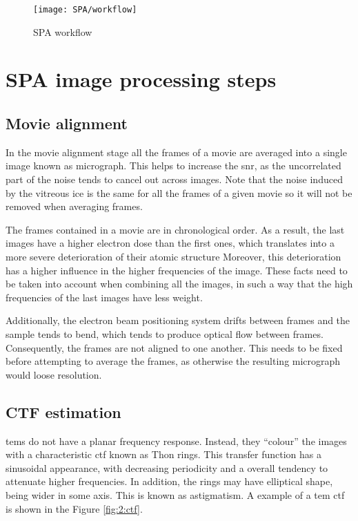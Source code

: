 \documentclass[../main.tex]{subfiles}
\begin{document}
\begin{landscape}
    \begin{figure}
        \centering
        \texttt{[image: SPA/workflow]}
        \caption{SPA workflow}
        \label{fig:2:spa_workflow}
    \end{figure}
\end{landscape}

\section{SPA image processing steps}

\subsection{Movie alignment}
In the movie alignment stage all the frames of a movie are averaged into a single image known as micrograph. This helps to increase the \gls{snr}, as the uncorrelated part of the noise tends to cancel out across images. Note that the noise induced by the vitreous ice is the same for all the frames of a given movie so it will not be removed when averaging frames. 

The frames contained in a movie are in chronological order. As a result, the last images have a higher electron dose than the first ones, which translates into a more severe deterioration of their atomic structure  Moreover, this deterioration has a higher influence in the higher frequencies of the image. These facts need to be taken into account when combining all the images, in such a way that the high frequencies of the last images have less weight\cite{cryoem101}. 

Additionally, the electron beam positioning system drifts between frames and the sample tends to bend, which tends to produce optical flow between frames. Consequently, the frames are not aligned to one another. This needs to be fixed before attempting to average the frames, as otherwise the resulting micrograph would loose resolution.

\subsection{CTF estimation}
\Glspl{tem} do not have a planar frequency response. Instead, they ``colour'' the images with a characteristic \gls{ctf} known as Thon rings. This transfer function has a sinusoidal appearance, with decreasing periodicity and a overall tendency to attenuate higher frequencies\cite{cryoem101}.  In addition, the rings may have elliptical shape, being wider in some axis. This is known as astigmatism. A example of a \gls{tem} \gls{ctf} is shown in the Figure \ref{fig:2:ctf}.
\end{document}

